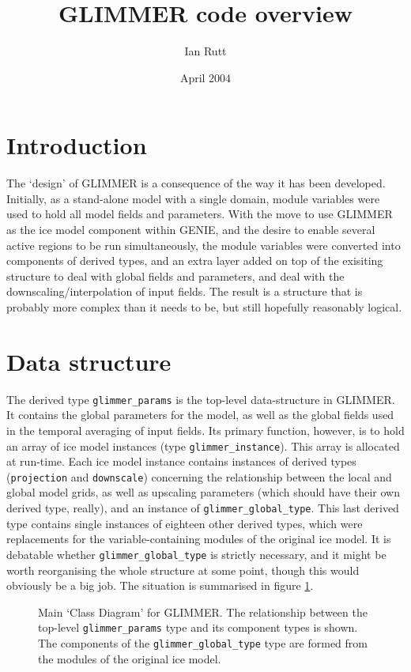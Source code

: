 \documentclass[11pt]{article}
\begin{document}
\title{GLIMMER code overview}
\date{April 2004}
\author{Ian Rutt}
\maketitle

\section{Introduction}

The `design' of GLIMMER is a consequence of the way it has been
developed. Initially, as a stand-alone model with a single domain, module
variables were used to hold all model fields and parameters. With the move to
use GLIMMER as the ice model component within GENIE, and the desire to enable
several active regions to be run simultaneously, the module variables were
converted into components of derived types, and an extra layer added on top of
the exisiting structure to deal with global fields and parameters, and deal
with the downscaling/interpolation of input fields. The result is a structure
that is probably more complex than it needs to be, but still hopefully
reasonably logical.

\section{Data structure}

The derived type \texttt{glimmer\_params} is the top-level data-structure in
GLIMMER. It contains the global parameters for the model, as well as the
global fields used in the temporal averaging of input fields. Its primary
function, however, is to hold an array of ice model instances (type
\texttt{glimmer\_instance}). This array is allocated at run-time. Each ice
model instance contains instances of derived types (\texttt{projection} and
\texttt{downscale}) concerning the relationship between the local and global
model grids, as well as upscaling parameters (which should have their own
derived type, really), and an instance of \texttt{glimmer\_global\_type}. This
last derived type contains single instances of eighteen other derived types,
which were replacements for the variable-containing modules of the original
ice model. It is debatable whether \texttt{glimmer\_global\_type} is strictly necessary,
and it might be worth reorganising the whole structure at some point, though
this would obviously be a big job. The situation is summarised in figure
\ref{main_class_diagram}.

\begin{figure}
\centering
{}
\caption{Main `Class Diagram' for GLIMMER. The relationship between the top-level
  \texttt{glimmer\_params} type and its component types is shown. The
  components of the \texttt{glimmer\_global\_type} type are formed from the
  modules of the original ice model.}
\label{main_class_diagram}
\end{figure}
\end{document}
